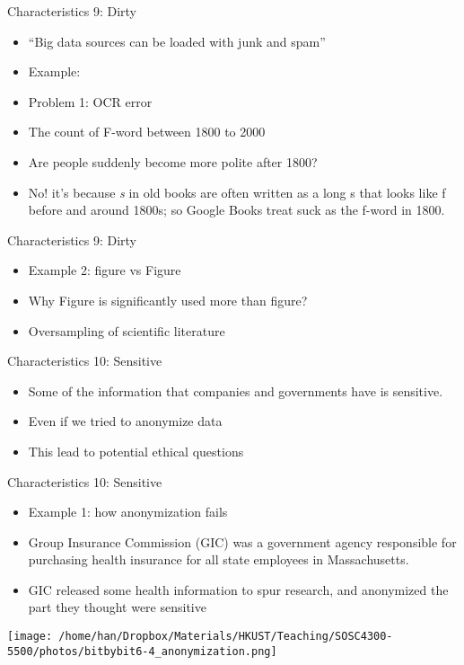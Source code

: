 \documentclass[handout]{beamer}
\begin{document}
\begin{frame}[label={h:f946b822-ebef-4c02-91d4-1dccdc31cc72}]{Characteristics 9: Dirty}
\begin{itemize}
\item ``Big data sources can be loaded with junk and spam''
\item Example: 
\item Problem 1: OCR error
\item The count of F-word between 1800 to 2000
\item Are people suddenly become more polite after 1800?
\item No! it's because \emph{s} in old books are often written as a long s that looks like f before and around 1800s; so Google Books treat suck as the f-word in 1800.
\end{itemize}
\end{frame}

\begin{frame}[label={h:9c0baf99-1e67-45ec-b741-112839de06b2}]{Characteristics 9: Dirty}
\begin{itemize}
\item Example 2: figure vs Figure
\item Why Figure is significantly used more than figure?
\item Oversampling of scientific literature
\end{itemize}
\end{frame}

\begin{frame}[label={h:65abf552-e659-4545-b2c7-488ebc83d778}]{Characteristics 10: Sensitive}
\begin{itemize}
\item Some of the information that companies and governments have is sensitive.
\item Even if we tried to anonymize data
\item This lead to potential ethical questions
\end{itemize}
\end{frame}

\begin{frame}[label={h:f6368a21-97ea-4295-bbbc-24f1ac7d1279}]{Characteristics 10: Sensitive}
\begin{itemize}
\item Example 1: how anonymization fails
\item Group Insurance Commission (GIC) was a government agency responsible for purchasing health insurance for all state employees in Massachusetts.
\item GIC released some health information to spur research, and anonymized the part they thought were sensitive
\end{itemize}

\begin{center}
\texttt{[image: /home/han/Dropbox/Materials/HKUST/Teaching/SOSC4300-5500/photos/bitbybit6-4\_anonymization.png]}
\end{center}
\end{frame}
\end{document}
